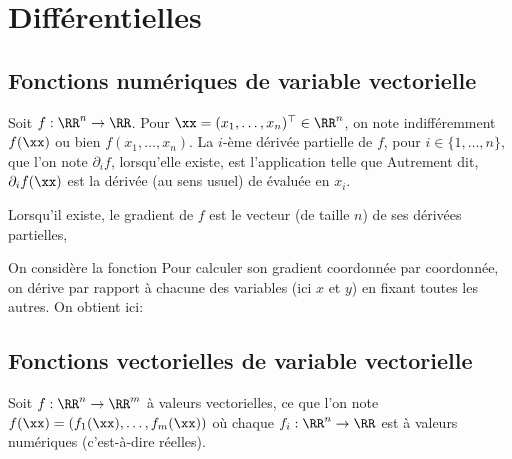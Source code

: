 \documentclass{article}
\begin{document}
\section{Différentielles}

\subsection{Fonctions numériques de variable vectorielle}
Soit $f : \RR^n \to \RR$. Pour $\xx = (x_1,\ldots,x_n)^\top \in \RR^n$, on note indifféremment $f(\xx)$ ou bien $f(x_1,\ldots,x_n)$.
%
La $i$-ème dérivée partielle de $f$, pour $i \in \{1,\ldots,n\}$, que l'on note $\partial_i f$, lorsqu'elle existe, est l'application telle que
Autrement dit, $\partial_i f(\xx)$ est la dérivée (au sens usuel) de  évaluée en $x_i$.

\begin{defn} Lorsqu'il existe, le gradient de $f$ est le vecteur (de taille $n$) de ses dérivées partielles, \ie
{}
\end{defn}

\begin{exmp} On considère la fonction
Pour calculer son gradient coordonnée par coordonnée, on dérive par rapport à chacune des variables (ici $x$ et $y$) en fixant toutes les autres. On obtient ici:
\end{exmp}

\subsection{Fonctions vectorielles de variable vectorielle}

Soit $f : \RR^n \to \RR^m$ à valeurs vectorielles, ce que l'on note $f(\xx) = (f_1(\xx),\ldots,f_m(\xx))$ où chaque $f_i : \RR^n \to \RR$ est à valeurs numériques (c'est-à-dire réelles).
\end{document}
